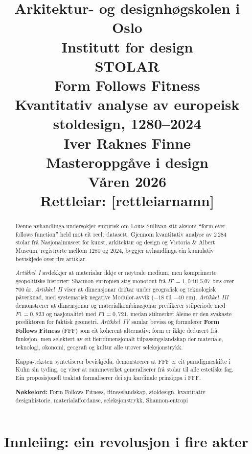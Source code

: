 \documentclass[12pt, a4paper]{article}
\title{%
  \vspace{-2cm}
  {\large Arkitektur- og designhøgskolen i Oslo}\\
  {\large Institutt for design}\\[2cm]
  {\Huge\textbf{STOLAR}}\\[0.5em]
  {\LARGE Form Follows Fitness}\\[0.5em]
  {\large Kvantitativ analyse av europeisk stoldesign, 1280--2024}\\[3cm]
  {\normalsize Iver Raknes Finne}\\[0.5em]
  {\small Masteroppgåve i design}\\
  {\small Våren 2026}\\[1em]
  {\small Rettleiar: [rettleiarnamn]}
}
\author{}
\date{}
\begin{document}
\maketitle
\thispagestyle{empty}
\newpage

\begin{abstract}
\noindent Denne avhandlinga undersøkjer empirisk om Louis Sullivan sitt aksiom ``form ever follows function'' held mot eit reelt datasett. Gjennom kvantitativ analyse av 2\,284 stolar frå Nasjonalmuseet for kunst, arkitektur og design og Victoria \& Albert Museum, registrerte mellom 1280 og 2024, byggjer avhandlinga ein kumulativ beviskjede over fire artiklar.

\emph{Artikkel~I} avdekkjer at materialar ikkje er nøytrale medium, men komprimerte geopolitiske historier: Shannon-entropien stig monotont frå $H' = 1{,}0$ til 5,07 bits over 700 år. \emph{Artikkel~II} viser at dimensjonar driftar under geografisk og teknologisk påverknad, med systematisk negative Modulor-avvik ($-18$ til $-40$ cm). \emph{Artikkel~III} demonstrerer at dimensjonar og materialkombinasjonar predikerer stilperiode med $F1 = 0{,}823$ og nasjonalitet med $F1 = 0{,}721$, medan stilmerket åleine er den svakaste prediktoren for faktisk geometri. \emph{Artikkel~IV} samlar bevisa og formulerer \textbf{Form Follows Fitness} (FFF) som eit koherent alternativ: form er ikkje dedusert frå funksjon, men selektert av eit fleirdimensjonalt tilpassingslandskap der materiale, teknologi, økonomi, geografi og kultur alle utøver seleksjonstrykk.

Kappa-teksten syntetiserer beviskjeda, demonstrerer at FFF er eit paradigmeskifte i Kuhn sin tyding, og viser at rammeverket generaliserer frå stolar til alle estetiske fag. Ein proposisjonell traktat formaliserer dei sju kardinale prinsippa i FFF.

\medskip
\noindent\textbf{Nøkkelord:} Form Follows Fitness, fitnesslandskap, stoldesign, kvantitativ designhistorie, materialaffordanse, seleksjonstrykk, Shannon-entropi
\end{abstract}

\newpage
\tableofcontents
\newpage


\section{Innleiing: ein revolusjon i fire akter}
\end{document}
